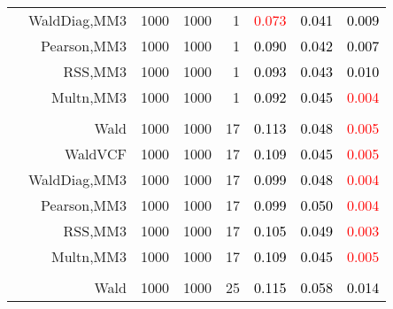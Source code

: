 \documentclass[
]{article}
\begin{document}
\begin{table}[H]
{\begin{tabular}[t]{lrrrrrrr}
\hspace{1em} & WaldDiag,MM3 & 1000 & 1000 & 1 & \textcolor{red}{0.073} & \textcolor{black}{0.041} & \textcolor{black}{0.009}\\

\hspace{1em} & Pearson,MM3 & 1000 & 1000 & 1 & \textcolor{black}{0.090} & \textcolor{black}{0.042} & \textcolor{black}{0.007}\\

\hspace{1em} & RSS,MM3 & 1000 & 1000 & 1 & \textcolor{black}{0.093} & \textcolor{black}{0.043} & \textcolor{black}{0.010}\\

\hspace{1em} & Multn,MM3 & 1000 & 1000 & 1 & \textcolor{black}{0.092} & \textcolor{black}{0.045} & \textcolor{red}{0.004}\\
\cmidrule{1-8}
\addlinespace[0.3em]
\multicolumn{8}{l}{\textbf{1F 15V}}\\
\hspace{1em} & Wald & 1000 & 1000 & 17 & \textcolor{black}{0.113} & \textcolor{black}{0.048} & \textcolor{red}{0.005}\\

\hspace{1em} & WaldVCF & 1000 & 1000 & 17 & \textcolor{black}{0.109} & \textcolor{black}{0.045} & \textcolor{red}{0.005}\\

\hspace{1em} & WaldDiag,MM3 & 1000 & 1000 & 17 & \textcolor{black}{0.099} & \textcolor{black}{0.048} & \textcolor{red}{0.004}\\

\hspace{1em} & Pearson,MM3 & 1000 & 1000 & 17 & \textcolor{black}{0.099} & \textcolor{black}{0.050} & \textcolor{red}{0.004}\\

\hspace{1em} & RSS,MM3 & 1000 & 1000 & 17 & \textcolor{black}{0.105} & \textcolor{black}{0.049} & \textcolor{red}{0.003}\\

\hspace{1em} & Multn,MM3 & 1000 & 1000 & 17 & \textcolor{black}{0.109} & \textcolor{black}{0.045} & \textcolor{red}{0.005}\\
\cmidrule{1-8}
\addlinespace[0.3em]
\multicolumn{8}{l}{\textbf{2F 10V}}\\
\hspace{1em} & Wald & 1000 & 1000 & 25 & \textcolor{black}{0.115} & \textcolor{black}{0.058} & \textcolor{black}{0.014}\\


\end{tabular}}
\end{table}
\end{document}
